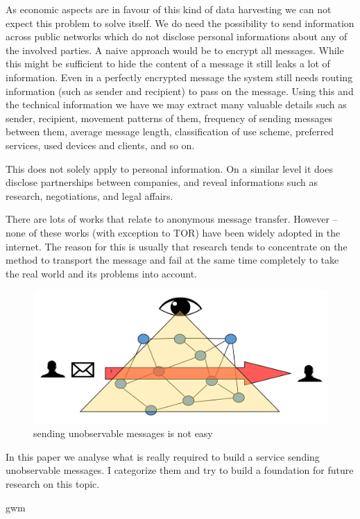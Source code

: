 \documentclass[12pt,journal,compsoc]{IEEEtran}
\begin{document}
As economic aspects are in favour of this kind of data harvesting we can not expect this problem to solve itself. We do need the possibility to send information across public networks which do not disclose personal informations about any of the involved parties. A naive approach would be to encrypt all messages. While this might be sufficient to hide the content of a message it still leaks a lot of information. Even in a perfectly encrypted message the system still needs routing information (such as sender and recipient) to pass on the message. Using this and the technical information we have we may extract many valuable details such as sender, recipient, movement patterns of them, frequency of sending messages between them, average message length, classification of use scheme, preferred services, used devices and clients, and so on.\par
This does not solely apply to personal information. On a similar level it does disclose partnerships between companies, and reveal informations such as research, negotiations, and legal affairs.
\par
There are lots of works\cite{tor-design}\cite{mixmaster-spec}\cite{xor-trees}\cite{Levine:2002}\cite{chaum-mix} that relate to anonymous message transfer. However -- none of these works (with exception to TOR\cite{tor-design}) have been widely adopted in the internet. The reason for this is usually that research tends to concentrate on the method to transport the message and fail at the same time completely to take the real world and its problems into account. 

\begin{figure}
	\includegraphics[width=0.9\linewidth]{../poster/messagetransfer.png}
	\caption{sending unobservable messages is not easy}
\end{figure}

In this paper we analyse what is really required to build a service sending unobservable messages. I categorize them and try to build a foundation for future research on this topic.
\par
\ifCLASSOPTIONpeerreview
\else
\hfill gwm
 
\end{document}
